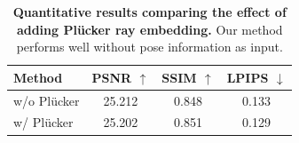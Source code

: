 \begin{table}[h!]
\centering
\caption{\textbf{Quantitative results comparing the effect of adding Plücker ray embedding.} Our method performs well without pose information as input.}
\label{tab:pluker_comparison}
\begin{tabular}{l|ccc}
\toprule
Method & PSNR $\uparrow$ & SSIM $\uparrow$ & LPIPS $\downarrow$ \\
\midrule
w/o Plücker & 25.212 & 0.848 & 0.133 \\
w/ Plücker & 25.202 & 0.851 & 0.129 \\
\bottomrule
\end{tabular}
\label{tab:ablation_pluker}
\end{table}
